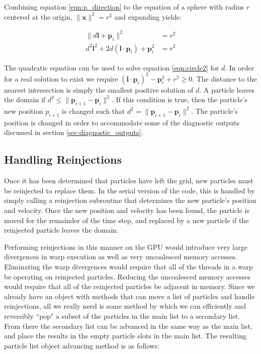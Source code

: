 Combining equation \ref{eqn:p_direction} to the equation of a sphere with radius $r$ centered at the origin, $\|\mathbf{x}\|^2  = r^2 $ and expanding yields:


\begin{align}
\|d\mathbf{l} + \mathbf{p}_i\|^2  &= r^2 \label{eqn:circle1} \\
d^2\mathbf{l}^2 + 2d(\mathbf{l}\cdot \mathbf{p}_i) + \mathbf{p}_i^2 &= r^2
\label{eqn:circle2}
\end{align}


The quadratic equation can be used to solve equation \ref{eqn:circle2} for $d$. In order for a real solution to exist we require $(\mathbf{l}\cdot \mathbf{p}_i)^2 - \mathbf{p}_i^2 + r^2 \geq 0$. The distance to the nearest intersection is simply the smallest positive solution of $d$. A particle leaves the domain if $d^2 \le \|\mathbf{p}_{i+1} - \mathbf{p}_{i}\|^2$. If this condition is true, then the particle's new position $p_{i+1}$ is changed such that $d^2 = \|\mathbf{p}_{i+1} - \mathbf{p}_{i}\|^2$. The particle's position is changed in order to accommodate some of the diagnostic outputs discussed in section \ref{sec:diagnostic_outputs}. 



		\subsection{Handling Reinjections}
		\label{sec:handling_reinjections}
Once it has been determined that particles have left the grid, new particles must be reinjected to replace them. In the serial version of the code, this is handled by simply calling a reinjection subroutine that determines the new particle's position and velocity. Once the new position and velocity has been found, the particle is moved for the remainder of the time step, and replaced by a new particle if the reinjected particle leaves the domain.  

Performing reinjections in this manner on the GPU would introduce very large divergences in warp execution as well as very uncoalesced memory accesses. Eliminating the warp divergences would require that all of the threads in a warp be operating on reinjected particles. Reducing the uncoalesced memory accesses would require that all of the reinjected particles be adjacent in memory.  Since we already have an object with methods that can move a list of particles and handle reinjections, all we really need is some method by which we can efficiently and reversibly ``pop" a subset of the particles in the main list to a secondary list. From there the secondary list can be advanced in the same way as the main list, and place the results in the empty particle slots in the main list. The resulting particle list object advancing method is as follows:

